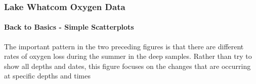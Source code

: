 \documentclass[10pt]{beamer}
\begin{document}
\begin{frame}
\frametitle{Lake Whatcom Oxygen Data}
\framesubtitle{Back to Basics - Simple Scatterplots}

\begin{center}
\hspace*{-5ex}
\end{center}

\vspace{-0.2in}
       {\scriptsize The important pattern in the two preceding figures is
  that there are different rates of oxygen loss during the summer in
  the deep samples.  Rather than try to show all depths and dates,
  this figure focuses on the changes that are occurring at specific depths and times\\}
\hspace*{2ex}

\end{frame}
\end{document}
